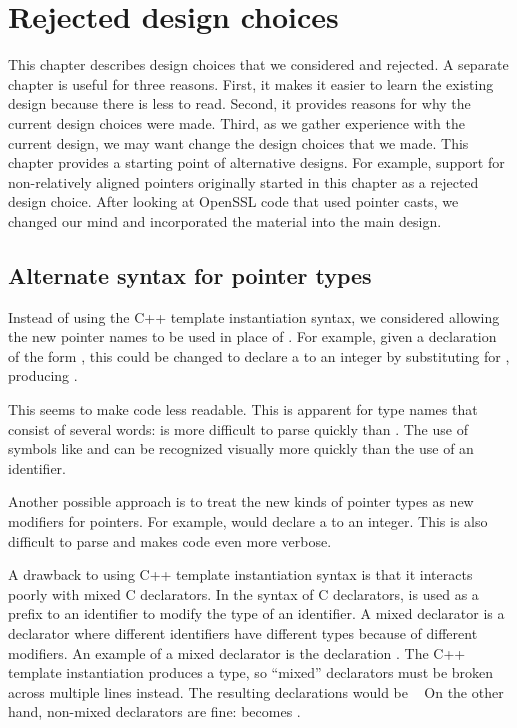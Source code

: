 
\chapter{Rejected design choices}
\label{chapter:design-alternatives}

This chapter describes design choices that we considered and rejected.
A separate chapter is useful for three reasons.   First, it makes it 
easier to learn the existing design because there is less to read.
Second, it provides reasons for why the current
design choices were made.  Third, as we gather experience with the current
design, we may want change the design choices that we made. 
This chapter provides a starting point 
of alternative designs.  For example, support for non-relatively 
aligned pointers originally started in this chapter as a rejected design choice. 
After looking at OpenSSL code that
used pointer casts, we changed our mind and incorporated
the material into the main design.

\section{Alternate syntax for pointer types}
\label{section:alternate-pointer-type-syntax}

Instead of using the C++ template instantiation syntax, we
considered allowing the new pointer names to be used in place of \code{*}.
For example, given a declaration of the form , this could be changed
to declare a  to an integer by substituting  for \code{*},
producing .
  
This seems to make code less readable.  This is apparent for type names that 
consist of several words:  is more
difficult to parse quickly than  .
The use of symbols like \code{<} and \code{>} can be recognized 
visually more quickly than the use  of an identifier.  

Another possible approach is to treat the new kinds
of pointer types  as new modifiers for pointers.  For example, 
 would declare a  to an integer. This is 
also difficult to parse and makes code even more verbose.

A drawback to using C++ template instantiation syntax is that it interacts
poorly with mixed C declarators. In the syntax of C declarators, \code{*} is used as
a prefix to an identifier to modify the type of an identifier. A mixed
declarator is a declarator where different identifiers have different
types because of different modifiers. An example of a mixed declarator
is the declaration . The C++ template instantiation produces a
type, so ``mixed'' declarators must be broken across multiple
lines instead. The resulting declarations would be 
 \ptrint\  On the other hand, non-mixed
declarators are fine:  becomes
\ptrint {}.

